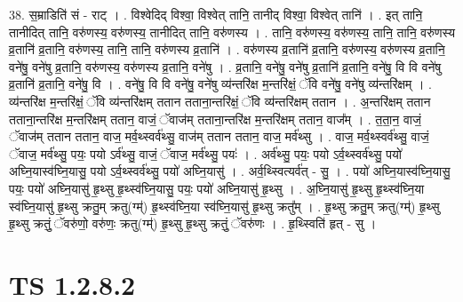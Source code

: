 \documentclass[17pt]{extarticle}
\begin{document}
38. स॒म्राडिति॑ सं - राट् । . विश्वेदिद् विश्वा॒ विश्वेत् तानि॒ तानीद् विश्वा॒ विश्वेत् तानि॑ । . इत् तानि॒ तानीदित् तानि॒ वरु॑णस्य॒ वरु॑णस्य॒ तानीदित् तानि॒ वरु॑णस्य । . तानि॒ वरु॑णस्य॒ वरु॑णस्य॒ तानि॒ तानि॒ वरु॑णस्य व्र॒तानि॑ व्र॒तानि॒ वरु॑णस्य॒ तानि॒ तानि॒ वरु॑णस्य व्र॒तानि॑ । . वरु॑णस्य व्र॒तानि॑ व्र॒तानि॒ वरु॑णस्य॒ वरु॑णस्य व्र॒तानि॒ वने॑षु॒ वने॑षु व्र॒तानि॒ वरु॑णस्य॒ वरु॑णस्य व्र॒तानि॒ वने॑षु । . व्र॒तानि॒ वने॑षु॒ वने॑षु व्र॒तानि॑ व्र॒तानि॒ वने॑षु॒ वि वि वने॑षु व्र॒तानि॑ व्र॒तानि॒ वने॑षु॒ वि । . वने॑षु॒ वि वि वने॑षु॒ वने॑षु व्य॑न्तरि॑क्ष म॒न्तरि॑क्षं॒ ॅवि वने॑षु॒ वने॑षु व्य॑न्तरि॑क्षम् । . व्य॑न्तरि॑क्ष म॒न्तरि॑क्षं॒ ॅवि व्य॑न्तरि॑क्षम् ततान तताना॒न्तरि॑क्षं॒ ॅवि व्य॑न्तरि॑क्षम् ततान । . अ॒न्तरि॑क्षम् ततान तताना॒न्तरि॑क्ष म॒न्तरि॑क्षम् ततान॒ वाजं॒ ॅवाज॑म् तताना॒न्तरि॑क्ष म॒न्तरि॑क्षम् ततान॒ वाज᳚म् । . त॒ता॒न॒ वाजं॒ ॅवाज॑म् ततान ततान॒ वाज॒ मर्व॒थ्स्वर्व॑थ्सु॒ वाज॑म् ततान ततान॒ वाज॒ मर्व॑थ्सु । . वाज॒ मर्व॒थ्स्वर्व॑थ्सु॒ वाजं॒ ॅवाज॒ मर्व॑थ्सु॒ पयः॒ पयो ऽर्व॑थ्सु॒ वाजं॒ ॅवाज॒ मर्व॑थ्सु॒ पयः॑ । . अर्व॑थ्सु॒ पयः॒ पयो ऽर्व॒थ्स्वर्व॑थ्सु॒ पयो॑ अघ्नि॒यास्व॑घ्नि॒यासु॒ पयो ऽर्व॒थ्स्वर्व॑थ्सु॒ पयो॑ अघ्नि॒यासु॑ । . अर्व॒थ्स्वित्यर्व॑त् - सु॒ । . पयो॑ अघ्नि॒यास्व॑घ्नि॒यासु॒ पयः॒ पयो॑ अघ्नि॒यासु॑ हृ॒थ्सु हृ॒थ्स्व॑घ्नि॒यासु॒ पयः॒ पयो॑ अघ्नि॒यासु॑ हृ॒थ्सु । . अ॒घ्नि॒यासु॑ हृ॒थ्सु हृ॒थ्स्व॑घ्नि॒या स्व॑घ्नि॒यासु॑ हृ॒थ्सु क्रतु॒म् क्रतु(ग्म्॑) हृ॒थ्स्व॑घ्नि॒या स्व॑घ्नि॒यासु॑ हृ॒थ्सु क्रतु᳚म् । . हृ॒थ्सु क्रतु॒म् क्रतु(ग्म्॑) हृ॒थ्सु हृ॒थ्सु क्रतुं॒ ॅवरु॑णो॒ वरु॑णः॒ क्रतु(ग्म्॑) हृ॒थ्सु हृ॒थ्सु क्रतुं॒ ॅवरु॑णः । . हृ॒थ्स्विति॑ हृत् - सु । \newline
\pagebreak
{}

\section{ TS 1.2.8.2 }
\end{document}
